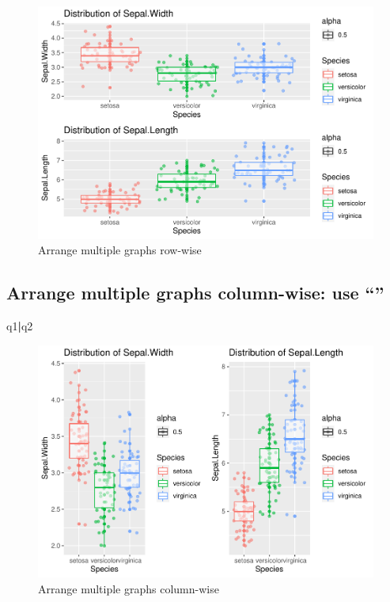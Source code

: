 \documentclass[]{article}
\newenvironment{Shaded}{\begin{snugshade}}{\end{snugshade}}
\newcommand{\NormalTok}[1]{#1}
\newcommand{\OperatorTok}[1]{\textcolor[rgb]{0.81,0.36,0.00}{\textbf{#1}}}
\begin{document}
\begin{figure}
\centering
\includegraphics{Week3Answers_files/figure-latex/unnamed-chunk-20-1.pdf}
\caption{Arrange multiple graphs row-wise}
\end{figure}

\newpage

\hypertarget{arrange-multiple-graphs-column-wise-use}{%
\subsection{Arrange multiple graphs column-wise: use
``\textbar{}''}\label{arrange-multiple-graphs-column-wise-use}}

\begin{Shaded}
\begin{Highlighting}[]
\NormalTok{q1}\OperatorTok{|}\NormalTok{q2}
\end{Highlighting}
\end{Shaded}

\begin{figure}
\centering
\includegraphics{Week3Answers_files/figure-latex/unnamed-chunk-21-1.pdf}
\caption{Arrange multiple graphs column-wise}
\end{figure}
\end{document}
